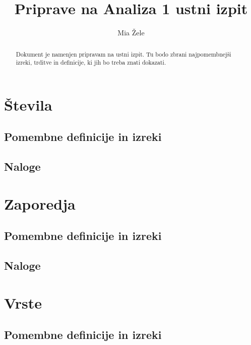 \documentclass[a4paper,12pt]{report}
\begin{document}
\title{Priprave na Analiza 1 ustni izpit}
\author{Mia Žele}
\date{}

\maketitle

\tableofcontents

\begin{abstract}
    Dokument je namenjen pripravam na ustni izpit. Tu bodo zbrani najpomembnejši
    izreki, trditve in definicije, ki jih bo treba znati dokazati.
\end{abstract}


\chapter{Števila}

\section*{Pomembne definicije in izreki}

\pagebreak

\section*{Naloge}


\chapter{Zaporedja}

\section*{Pomembne definicije in izreki}

\pagebreak

\section*{Naloge}


\chapter{Vrste}

\section*{Pomembne definicije in izreki}
\end{document}
